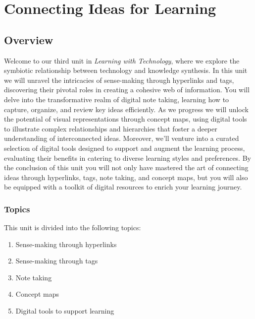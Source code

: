 \documentclass[
  letterpaper,
  DIV=11,
  numbers=noendperiod]{scrreprt}
\providecommand{\tightlist}{%
  \setlength{\itemsep}{0pt}\setlength{\parskip}{0pt}}\usepackage{longtable,booktabs,array}
\begin{document}

\chapter{Connecting Ideas for
Learning}\label{connecting-ideas-for-learning}

\section*{Overview}\label{overview-2}


Welcome to our third unit in \emph{Learning with Technology}, where we
explore the symbiotic relationship between technology and knowledge
synthesis. In this unit we will unravel the intricacies of sense-making
through hyperlinks and tags, discovering their pivotal roles in creating
a cohesive web of information. You will delve into the transformative
realm of digital note taking, learning how to capture, organize, and
review key ideas efficiently. As we progress we will unlock the
potential of visual representations through concept maps, using digital
tools to illustrate complex relationships and hierarchies that foster a
deeper understanding of interconnected ideas. Moreover, we'll venture
into a curated selection of digital tools designed to support and
augment the learning process, evaluating their benefits in catering to
diverse learning styles and preferences. By the conclusion of this unit
you will not only have mastered the art of connecting ideas through
hyperlinks, tags, note taking, and concept maps, but you will also be
equipped with a toolkit of digital resources to enrich your learning
journey.

\subsection*{Topics}\label{topics-2}

This unit is divided into the following topics:

\begin{enumerate}
\def\labelenumi{\arabic{enumi}.}
\tightlist
\item
  Sense-making through hyperlinks
\item
  Sense-making through tags
\item
  Note taking
\item
  Concept maps
\item
  Digital tools to support learning
\end{enumerate}
\end{document}

